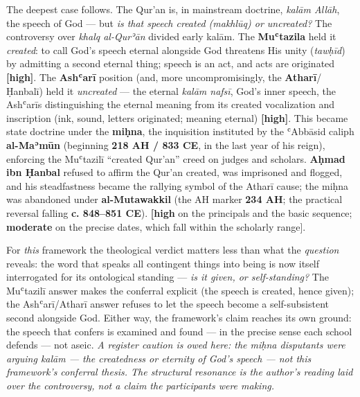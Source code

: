 \documentclass[11pt]{article}
\begin{document}
The deepest case follows. The Qur'an is, in mainstream doctrine, \emph{kalām Allāh}, the speech of God — but \emph{is that speech created (makhlūq) or uncreated?} The controversy over \emph{khalq al-Qurʾān} divided early kalām. The \textbf{Muʿtazila} held it \emph{created}: to call God's speech eternal alongside God threatens His unity (\emph{tawḥīd}) by admitting a second eternal thing; speech is an act, and acts are originated \textbf{[high]}. The \textbf{Ashʿarī} position (and, more uncompromisingly, the \textbf{Atharī}/\allowbreak{}Ḥanbalī) held it \emph{uncreated} — the eternal \emph{kalām nafsī}, God's inner speech, the Ashʿarīs distinguishing the eternal meaning from its created vocalization and inscription (ink, sound, letters originated; meaning eternal) \textbf{[high]}. This became state doctrine under the \textbf{miḥna}, the inquisition instituted by the ʿAbbāsid caliph \textbf{al-Maʾmūn} (beginning \textbf{218 AH /\allowbreak{} 833 CE}, in the last year of his reign), enforcing the Muʿtazilī ``created Qur'an'' creed on judges and scholars. \textbf{Aḥmad ibn Ḥanbal} refused to affirm the Qur'an created, was imprisoned and flogged, and his steadfastness became the rallying symbol of the Atharī cause; the miḥna was abandoned under \textbf{al-Mutawakkil} (the AH marker \textbf{234 AH}; the practical reversal falling \textbf{c. 848–851 CE}). \textbf{[high} on the principals and the basic sequence; \textbf{moderate} on the precise dates, which fall within the scholarly range].

For \emph{this} framework the theological verdict matters less than what the \emph{question} reveals: the word that speaks all contingent things into being is now itself interrogated for its ontological standing — \emph{is it given, or self-standing?} The Muʿtazilī answer makes the conferral explicit (the speech is created, hence given); the Ashʿarī/\allowbreak{}Atharī answer refuses to let the speech become a self-subsistent second alongside God. Either way, the framework's claim reaches its own ground: the speech that confers is examined and found — in the precise sense each school defends — not aseic. \emph{A register caution is owed here: the miḥna disputants were arguing kalām — the createdness or eternity of God's speech — not this framework's conferral thesis. The structural resonance is the author's reading laid over the controversy, not a claim the participants were making.}
\end{document}
